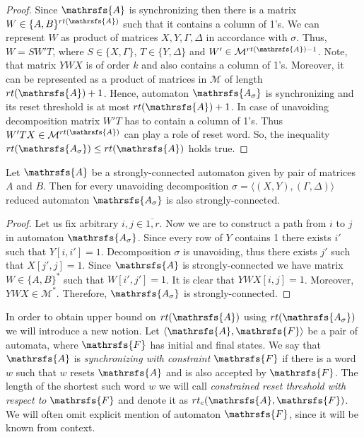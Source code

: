 \documentclass[11pt]{llncs}
\newcommand{\A}{\mathrsfs{A}}
\newcommand{\AD}{\mathrsfs{A_{\sigma}}}
\newcommand{\G}{\Gamma}
\newcommand{\D}{\Delta}
\newcommand{\rt}{rt}
\newcommand{\rtc}{rt_{c}}
\begin{document}
\begin{proof}
Since $\A$ is synchronizing then there is a matrix $W \in \{A, B\}^{\rt(\A)}$ such
that it contains a column of 1's. We can represent $W$ as product of matrices $X,Y,\G,\D$ in 
accordance with $\sigma$. Thus, $W = SW'T$, where $S \in \{X,\G\}$, $T \in \{Y,\D\}$ and $W' \in \mathcal{M}^{\rt(\A) - 1}$.
Note, that matrix $YWX$ is of order $k$ and also contains a column of 1's. Moreover, it can be represented
as a product of matrices in $\mathcal{M}$ of length $\rt(\A) + 1$. Hence, automaton $\AD$ is
synchronizing and its reset threshold is at most $\rt(\A) + 1$.
In case of unavoiding decomposition matrix $W'T$ has to contain a column of 1's.
Thus $W'TX \in \mathcal{M}^{\rt(\A)}$ can play a role of reset word. So, the inequality $\rt(\AD) \leq \rt(\A)$ holds true.
\end{proof}


\begin{proposition}
Let $\A$ be a strongly-connected automaton given by pair of matrices $A$ and $B$.
Then for every unavoiding decomposition $\sigma = \langle(X,Y),(\G,\D)\rangle$ reduced automaton $\AD$
is also strongly-connected.
\end{proposition}

\begin{proof}
Let us fix arbitrary $i,j \in \overline{1,r}$. Now we are to construct a path from $i$ to $j$ 
in automaton $\AD$. Since every row of $Y$ contains 1 there
exists $i'$ such that $Y[i,i'] = 1$. Decomposition $\sigma$ is unavoiding, thus
there exists $j'$ such that $X[j',j] = 1$. Since $\A$ is strongly-connected we have matrix 
$W \in \{A,B\}^*$ such that $W[i',j'] = 1$. It is clear that $YWX[i,j] = 1$. Moreover,
$YWX \in \mathcal{M}^*$. Therefore, $\AD$ is strongly-connected.
\end{proof}
In order to obtain upper bound on $\rt(\A)$ using $\rt(\AD)$ we will introduce a new notion.
Let $\langle \A , \mathrsfs{F} \rangle$ be a pair of automata, where $\mathrsfs{F}$ has initial and final states. 
We say that $\A$ is \emph{synchronizing with constraint} $\mathrsfs{F}$ if there is a word $w$ such that
$w$ resets $\A$ and is also accepted by $\mathrsfs{F}$. The length of the shortest such
word $w$ we will call \emph{constrained reset threshold with respect to} $\mathrsfs{F}$ and denote it as $\rtc(\A, \mathrsfs{F})$.
We will often omit explicit mention of automaton $\mathrsfs{F}$, since it will be known from context.
\end{document}

